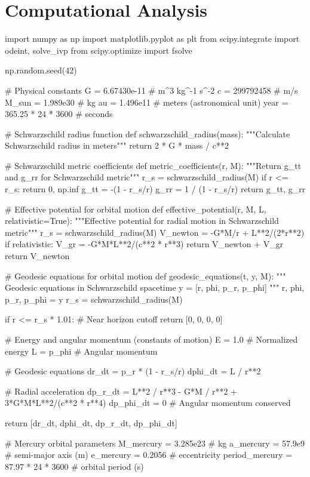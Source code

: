 \documentclass[a4paper, 11pt]{article}
\begin{document}
\section{Computational Analysis}

\begin{pycode}
import numpy as np
import matplotlib.pyplot as plt
from scipy.integrate import odeint, solve_ivp
from scipy.optimize import fsolve

np.random.seed(42)

# Physical constants
G = 6.67430e-11  # m^3 kg^-1 s^-2
c = 299792458    # m/s
M_sun = 1.989e30 # kg
au = 1.496e11    # meters (astronomical unit)
year = 365.25 * 24 * 3600  # seconds

# Schwarzschild radius function
def schwarzschild_radius(mass):
    """Calculate Schwarzschild radius in meters"""
    return 2 * G * mass / c**2

# Schwarzschild metric coefficients
def metric_coefficients(r, M):
    """Return g_tt and g_rr for Schwarzschild metric"""
    r_s = schwarzschild_radius(M)
    if r <= r_s:
        return 0, np.inf
    g_tt = -(1 - r_s/r)
    g_rr = 1 / (1 - r_s/r)
    return g_tt, g_rr

# Effective potential for orbital motion
def effective_potential(r, M, L, relativistic=True):
    """Effective potential for radial motion in Schwarzschild metric"""
    r_s = schwarzschild_radius(M)
    V_newton = -G*M/r + L**2/(2*r**2)
    if relativistic:
        V_gr = -G*M*L**2/(c**2 * r**3)
        return V_newton + V_gr
    return V_newton

# Geodesic equations for orbital motion
def geodesic_equations(t, y, M):
    """
    Geodesic equations in Schwarzschild spacetime
    y = [r, phi, p_r, p_phi]
    """
    r, phi, p_r, p_phi = y
    r_s = schwarzschild_radius(M)

    if r <= r_s * 1.01:  # Near horizon cutoff
        return [0, 0, 0, 0]

    # Energy and angular momentum (constants of motion)
    E = 1.0  # Normalized energy
    L = p_phi  # Angular momentum

    # Geodesic equations
    dr_dt = p_r * (1 - r_s/r)
    dphi_dt = L / r**2

    # Radial acceleration
    dp_r_dt = L**2 / r**3 - G*M / r**2 + 3*G*M*L**2/(c**2 * r**4)
    dp_phi_dt = 0  # Angular momentum conserved

    return [dr_dt, dphi_dt, dp_r_dt, dp_phi_dt]

# Mercury orbital parameters
M_mercury = 3.285e23  # kg
a_mercury = 57.9e9    # semi-major axis (m)
e_mercury = 0.2056    # eccentricity
period_mercury = 87.97 * 24 * 3600  # orbital period (s)


\end{pycode}
\end{document}
